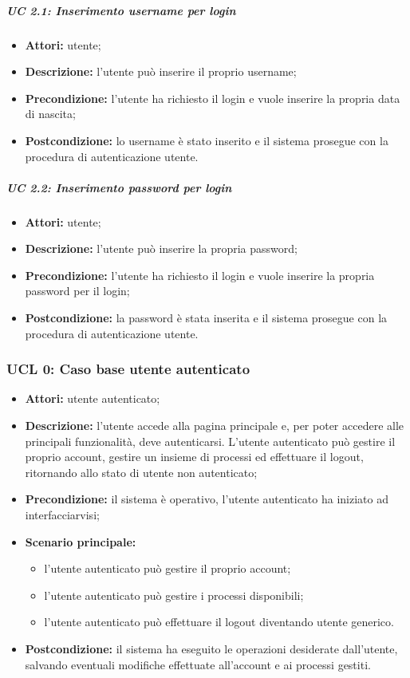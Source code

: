 \subparagraph{UC 2.1: Inserimento username per login}
\begin{itemize}
\item \textbf{Attori:} utente;
\item \textbf{Descrizione:} l'utente può inserire il proprio username;
\item \textbf{Precondizione:} l'utente ha richiesto il login e vuole inserire la propria data di nascita;
\item \textbf{Postcondizione:} lo username è stato inserito e il sistema prosegue con la procedura di autenticazione utente.
\end{itemize}

\subparagraph{UC 2.2: Inserimento password per login}
\begin{itemize}
\item \textbf{Attori:} utente;
\item \textbf{Descrizione:} l'utente può inserire la propria password;
\item \textbf{Precondizione:} l'utente ha richiesto il login e vuole inserire la propria password per il login;
\item \textbf{Postcondizione:} la password è stata inserita e il sistema prosegue con la procedura di autenticazione utente.
\end{itemize}

\subsubsection{UCL 0: Caso base utente autenticato}

\begin{itemize}
\item \textbf{Attori:} utente autenticato;
\item \textbf{Descrizione:} l'utente accede alla pagina principale e, per poter accedere alle principali funzionalità, deve autenticarsi.
L'utente autenticato può gestire il proprio account, gestire un insieme di processi ed effettuare il logout, ritornando allo stato di utente non autenticato;
\item \textbf{Precondizione:} il sistema è operativo, l'utente autenticato ha iniziato ad interfacciarvisi;
\item \textbf{Scenario principale:}
\begin{itemize}
\item l'utente autenticato può gestire il proprio account;
\item l'utente autenticato può gestire i processi disponibili;
\item l'utente autenticato può effettuare il logout diventando utente generico.
\end{itemize}
\item \textbf{Postcondizione:} il sistema ha eseguito le operazioni desiderate dall'utente, salvando eventuali modifiche effettuate all'account e ai processi gestiti.
\end{itemize}

